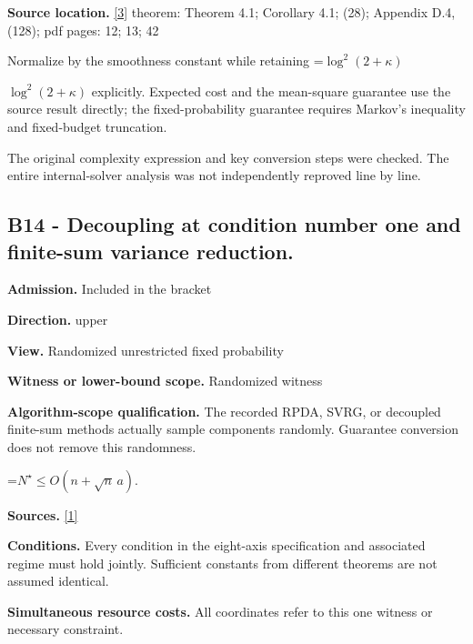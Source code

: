 \documentclass[10pt,a4paper]{article}
\newcommand{\AtlasMath}[1]{\par\begingroup\centering\setbox0=\hbox{$\displaystyle #1$}\ifdim\wd0>1.4\linewidth\typeout{ATLAS WIDE FORMULA: \the\wd0}\fi\ifdim\wd0>\linewidth\resizebox{\linewidth}{!}{\box0}\else\box0\fi\par\endgroup}
\newcommand{\AtlasInlineMath}[1]{\begingroup\setbox0=\hbox{$#1$}\ifdim\wd0>.4\linewidth\endgroup\AtlasMath{#1}\else\endgroup$#1$\fi}
\begin{document}
\textbf{Source location.} \href{https://arxiv.org/pdf/2103.15888v1}{[3]} theorem: Theorem 4.1; Corollary 4.1; (28); Appendix D.4, (128); pdf pages: 12; 13; 42



Normalize by the smoothness constant while retaining \AtlasInlineMath{\log^2(2+\kappa)} explicitly. Expected cost and the mean-square guarantee use the source result directly; the fixed-probability guarantee requires Markov's inequality and fixed-budget truncation.



The original complexity expression and key conversion steps were checked. The entire internal-solver analysis was not independently reproved line by line.



\subsection{B14 - Decoupling at condition number one and finite-sum variance reduction.}


\textbf{Admission.} Included in the bracket



\textbf{Direction.} upper



\textbf{View.} Randomized unrestricted fixed probability



\textbf{Witness or lower-bound scope.} Randomized witness



\textbf{Algorithm-scope qualification.} The recorded RPDA, SVRG, or decoupled finite-sum methods actually sample components randomly. Guarantee conversion does not remove this randomness.



\AtlasMath{N^\star\le O(n+\sqrt n\,a).}


\textbf{Sources.} \href{https://arxiv.org/pdf/2610.04944v1}{[1]}



\textbf{Conditions.} Every condition in the eight-axis specification and associated regime must hold jointly. Sufficient constants from different theorems are not assumed identical.



\textbf{Simultaneous resource costs.} All coordinates refer to this one witness or necessary constraint.
\end{document}
